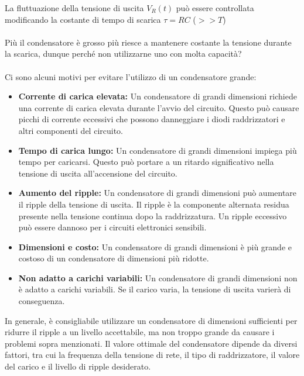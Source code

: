 La fluttuazione della tensione di uscita $V_R(t)$ può essere controllata
modificando la costante di tempo di scarica $\tau = RC$ ($>>T$)
\paragraph{}
Più il condensatore è grosso più riesce a mantenere costante la tensione durante la scarica, dunque perché non utilizzarne uno con molta capacità?
\paragraph{}
Ci sono alcuni motivi per evitare l'utilizzo di un condensatore grande:

\begin{itemize}
    \item \textbf{Corrente di carica elevata:} Un condensatore di grandi dimensioni richiede una corrente di carica elevata durante l'avvio del circuito. Questo può causare picchi di corrente eccessivi che possono danneggiare i diodi raddrizzatori e altri componenti del circuito.
    \item \textbf{Tempo di carica lungo:} Un condensatore di grandi dimensioni impiega più tempo per caricarsi. Questo può portare a un ritardo significativo nella tensione di uscita all'accensione del circuito.
    \item \textbf{Aumento del ripple:} Un condensatore di grandi dimensioni può aumentare il ripple della tensione di uscita. Il ripple è la componente alternata residua presente nella tensione continua dopo la raddrizzatura. Un ripple eccessivo può essere dannoso per i circuiti elettronici sensibili.
    \item \textbf{Dimensioni e costo:} Un condensatore di grandi dimensioni è più grande e costoso di un condensatore di dimensioni più ridotte.

    \item \textbf{Non adatto a carichi variabili:} Un condensatore di grandi dimensioni non è adatto a carichi variabili. Se il carico varia, la tensione di uscita varierà di conseguenza.
\end{itemize}

In generale, è consigliabile utilizzare un condensatore di dimensioni sufficienti per ridurre il ripple a un livello accettabile, ma non troppo grande da causare i problemi sopra menzionati. Il valore ottimale del condensatore dipende da diversi fattori, tra cui la frequenza della tensione di rete, il tipo di raddrizzatore, il valore del carico e il livello di ripple desiderato.


